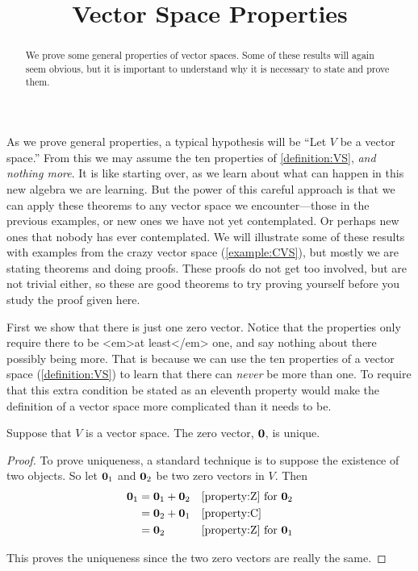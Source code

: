 \documentclass{ximera}
\title{Vector Space Properties}
\begin{document}
\begin{abstract}
  We prove some general properties of vector spaces.  Some of these results will again seem obvious, but it is important to understand why it is necessary to state and prove them.
\end{abstract}
\maketitle

As we prove general properties, a typical hypothesis will be ``Let $V$
be a vector space.''  From this we may assume the ten properties of
\ref{definition:VS}, \textit{and nothing more}.  It is like starting
over, as we learn about what can happen in this new algebra we are
learning.  But the power of this careful approach is that we can apply
these theorems to any vector space we encounter---those in the
previous examples, or new ones we have not yet contemplated.  Or
perhaps new ones that nobody has ever contemplated.  We will
illustrate some of these results with examples from the crazy vector
space (\ref{example:CVS}), but mostly we are stating theorems and
doing proofs.  These proofs do not get too involved, but are not
trivial either, so these are good theorems to try proving yourself
before you study the proof given here.

First we show that there is just one zero vector.  Notice that the
properties only require there to be <em>at least</em> one, and say
nothing about there possibly being more.  That is because we can use
the ten properties of a vector space (\ref{definition:VS}) to learn
that there can \textit{never} be more than one.  To require that this
extra condition be stated as an eleventh property would make the
definition of a vector space more complicated than it needs to be.

\begin{theorem}
  \label{theorem:ZVU}
  
  Suppose that $V$ is a vector space.  The zero vector, $\mathbf{0}$,
  is unique.
  
  \begin{proof}
    To prove uniqueness, a standard technique is to suppose the
    existence of two objects.  So let $\mathbf{0}_1$ and
    $\mathbf{0}_2$ be two zero vectors in $V$.  Then
    \begin{align*}
      \mathbf{0}_1
      &=\mathbf{0}_1+\mathbf{0}_2
      &&\ref{property:Z}\text{ for }\mathbf{0}_2\\
      &=\mathbf{0}_2+\mathbf{0}_1
      &&\ref{property:C}\\
      &=\mathbf{0}_2
      &&\ref{property:Z}\text{ for }\mathbf{0}_1
    \end{align*}
    
    This proves the uniqueness since the two zero vectors are really the same.
  \end{proof}
\end{theorem}
\end{document}
